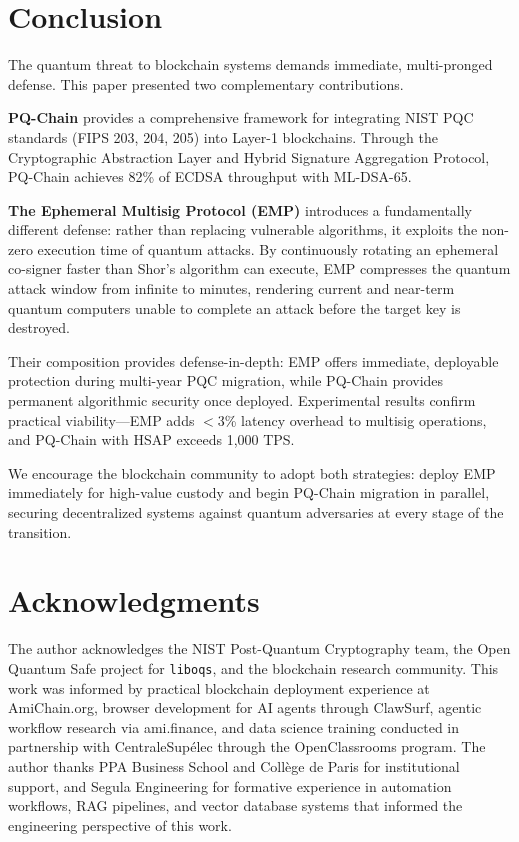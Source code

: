 \documentclass[12pt, a4paper, twocolumn]{article}
\begin{document}
\section{Conclusion}
\label{sec:conclusion}

The quantum threat to blockchain systems demands immediate, multi-pronged defense. This paper presented two complementary contributions.

\textbf{PQ-Chain} provides a comprehensive framework for integrating NIST PQC standards (FIPS 203, 204, 205) into Layer-1 blockchains. Through the Cryptographic Abstraction Layer and Hybrid Signature Aggregation Protocol, PQ-Chain achieves 82\% of ECDSA throughput with ML-DSA-65.

\textbf{The Ephemeral Multisig Protocol (EMP)} introduces a fundamentally different defense: rather than replacing vulnerable algorithms, it exploits the non-zero execution time of quantum attacks. By continuously rotating an ephemeral co-signer faster than Shor's algorithm can execute, EMP compresses the quantum attack window from infinite to minutes, rendering current and near-term quantum computers unable to complete an attack before the target key is destroyed.

Their composition provides defense-in-depth: EMP offers immediate, deployable protection during multi-year PQC migration, while PQ-Chain provides permanent algorithmic security once deployed. Experimental results confirm practical viability---EMP adds $<$3\% latency overhead to multisig operations, and PQ-Chain with HSAP exceeds 1,000 TPS.

We encourage the blockchain community to adopt both strategies: deploy EMP immediately for high-value custody and begin PQ-Chain migration in parallel, securing decentralized systems against quantum adversaries at every stage of the transition.

\section*{Acknowledgments}

The author acknowledges the NIST Post-Quantum Cryptography team, the Open Quantum Safe project for \texttt{liboqs}, and the blockchain research community. This work was informed by practical blockchain deployment experience at AmiChain.org, browser development for AI agents through ClawSurf, agentic workflow research via ami.finance, and data science training conducted in partnership with CentraleSup\'elec through the OpenClassrooms program. The author thanks PPA Business School and Coll\`ege de Paris for institutional support, and Segula Engineering for formative experience in automation workflows, RAG pipelines, and vector database systems that informed the engineering perspective of this work.
\end{document}
